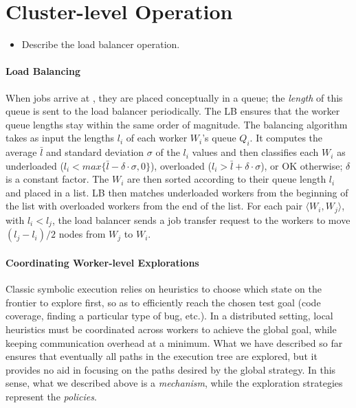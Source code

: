 
\section{Cluster-level Operation}
\label{sec:loadBalancing}

\begin{itemize}
\item Describe the load balancer operation.
\end{itemize}

\paragraph{Load Balancing}

When jobs arrive at \wdst, they are placed conceptually in a queue; the \emph{length} of this queue is sent to the load balancer periodically.  The LB ensures that the worker queue lengths stay within the same order of magnitude.  The balancing algorithm takes as input the lengths $l_i$ of each worker $W_i$'s queue $Q_i$.  It computes the average $\bar{l}$ and standard deviation $\sigma$ of the $l_i$ values and then classifies each $W_i$ as underloaded ($l_i < max \{ \bar{l}-\delta \cdot \sigma, 0 \}$), overloaded ($l_i > \bar{l} + \delta \cdot \sigma$), or OK otherwise; $\delta$ is a constant factor.  The $W_i$ are then sorted according to their queue length $l_i$ and placed in a list.  LB then matches underloaded workers from the beginning of the list with overloaded workers from the end of the list.  For each pair $\langle W_i,W_j \rangle$, with $l_i < l_j$, the load balancer sends a job transfer request to the workers to  move $(l_j - l_i)/2$ \candidate nodes from $W_j$ to $W_i$.


\paragraph{Coordinating Worker-level Explorations}
\label{sec:globalStrategy}

Classic symbolic execution relies on heuristics to choose which state on the frontier to explore first, so as to efficiently reach the chosen test goal (code coverage, finding a particular type of bug, etc.). In a distributed setting, local heuristics must be coordinated across workers to achieve the global goal, while keeping communication overhead at a minimum. What we have described so far ensures that eventually all paths in the execution tree are explored, but it provides no aid in focusing on the paths desired by the global strategy.  In this sense, what we described above is a \emph{mechanism}, while the exploration strategies represent the \emph{policies}.

